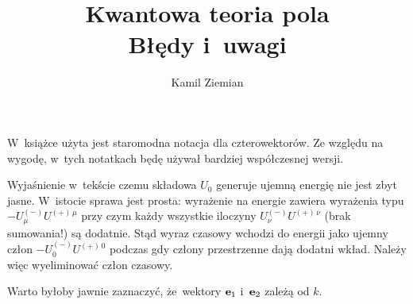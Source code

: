 \documentclass[a4paper,11pt]{article}
\title{Kwantowa teoria pola \\
  {\Large Błędy i~uwagi}}
\author{Kamil Ziemian}
\begin{document}





\maketitle %






\vspace{0em}



\vspace{0em}


\noindent
W~książce użyta jest staromodna notacja dla czterowektorów. Ze względu
na wygodę, w~tych notatkach będę używał bardziej współczesnej wersji.







\noindent
{} Wyjaśnienie w~tekście czemu składowa $U_{ 0 }$ generuje
ujemną energię nie jest zbyt jasne. W~istocie sprawa jest prosta:
wyrażenie na energie zawiera wyrażenia typu
$-U^{ ( - ) }_{ \mu } U^{ ( + ) \, \mu }$ przy czym każdy wszystkie
iloczyny $U^{ ( - ) }_{ \nu } U^{ ( + )\, \nu }$ (brak sumowania!) są
dodatnie. Stąd wyraz czasowy wchodzi do energii jako ujemny człon
$-U^{ ( - ) }_{ 0 } U^{ ( + )\, 0 }$ podczas gdy człony przestrzenne
dają dodatni wkład. Należy więc wyeliminować człon czasowy.

\vspace{\spaceFour}





\noindent
{} Warto byłoby jawnie zaznaczyć, że~wektory $\mathbf{e}_{ 1 }$
i~$\mathbf{e}_{ 2 }$ zależą od $k$.

\vspace{\spaceFour}
\end{document}
